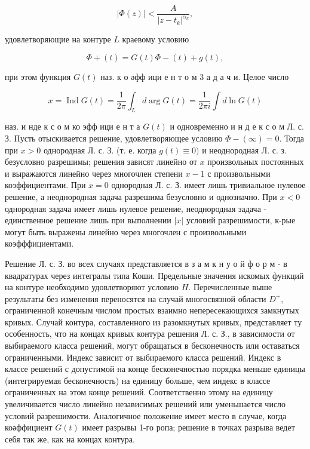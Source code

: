 \documentclass[10pt]{article}
\begin{document}
\[

|\Phi(z)|<\frac{A}{\left|z-t_{k}\right|^{\alpha_{k}}},

\]



удовлетворяющие на контуре $L$ краевому условию



\[

\Phi+(t)=G(t) \Phi-(t)+g(t),

\]



при этом функция $G(t)$ наз. к о әфф ици е н т о м 3 а д а ч и. Целое число



\[

x=\operatorname{Ind} G(t)=\frac{1}{2 \pi} \int_{L} d \arg G(t)=\frac{1}{2 \pi i} \int d \ln G(t)

\]



наз. и нде к с о м ко эфф ици е н т а $G(t)$ и одновременно и н д е к с о м Л. с. З. Пусть отыскивается решение, удовлетворяющее условию $\Phi-(\infty)=0$. Тогда при $x>0$ однородная Л. с. З. (т. е. когда $g(t) \equiv 0)$ и неоднородная Л. с. з. безусловно разрешимы; решения зависят линейно от $x$ произвольных постоянных и выражаются линейно через многочлен степени $x-1$ с произвольными коэффициентами. При $x=0$ однородная Л. с. З. имеет лишь тривиальное нулевое решение, а неоднородная задача разрешима безусловно и однозначно. При $x<0$ однородная задача имеет лишь нулевое решение, неоднородная задача - единственное решение лишь при выполнении $|x|$ условий разрешимости, к-рые могут быть выражены линейно через многочлен с произвольными коэфффициентами.



Решение Л. с. З. во всех случаях представляется в $з$ а м к н у о й ф о р м - в квадратурах через интегралы типа Коши. Предельные значения искомых функций на контуре необходимо удовлетворяют условию $H$. Перечисленные выше результаты без изменения переносятся на случай многосвязной области $D^{+}$, ограниченной конечным числом простых взаимно непересекающихся замкнутых кривых. Случай контура, составленного из разомкнутых кривых, представляет ту особенность, что на концах кривых контура решения Л. с. З., в зависимости от выбираемого класса решений, могут обращаться в бесконечность или оставаться ограниченными. Индекс зависит от выбираемого класса решений. Индекс в классе решений с допустимой на конце бесконечностью порядка меньше единицы (интегрируемая бесконечность) на единицу больше, чем индекс в классе ограниченных на этом конце решений. Соответственно этому на единицу увеличивается число линейно независимых решений или уменьшается число условий разрешимости. Аналогичное положение имеет место в случае, когда коәффициент $G(t)$ имеет разрывы 1-го ропа; решение в точках разрыва ведет себя так же, как на концах контура.
\end{document}
